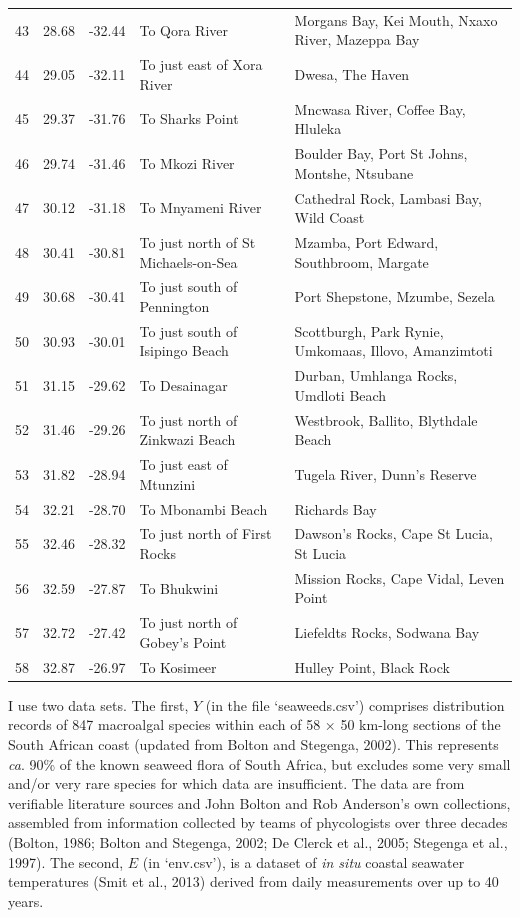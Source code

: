 \documentclass[10pt,a4,]{article}
\begin{document}
\begin{tiny}
\begin{center}
\begin{longtable}{|r|r|r|l|p{6cm}|}
43 & 28.68 & -32.44 & To Qora River & Morgans Bay, Kei Mouth, Nxaxo River, Mazeppa Bay \\
44 & 29.05 & -32.11 & To just east of Xora River & Dwesa, The Haven \\
45 & 29.37 & -31.76 & To Sharks Point & Mncwasa River, Coffee Bay, Hluleka \\
46 & 29.74 & -31.46 & To Mkozi River & Boulder Bay, Port St Johns, Montshe, Ntsubane \\
47 & 30.12 & -31.18 & To Mnyameni River & Cathedral Rock, Lambasi Bay, Wild Coast \\
48 & 30.41 & -30.81 & To just north of St Michaels-on-Sea & Mzamba, Port Edward, Southbroom, Margate \\
49 & 30.68 & -30.41 & To just south of Pennington & Port Shepstone, Mzumbe, Sezela \\
50 & 30.93 & -30.01 & To just south of Isipingo Beach & Scottburgh, Park Rynie, Umkomaas, Illovo, Amanzimtoti \\
51 & 31.15 & -29.62 & To Desainagar & Durban, Umhlanga Rocks, Umdloti Beach \\
52 & 31.46 & -29.26 & To just north of Zinkwazi Beach & Westbrook, Ballito, Blythdale Beach \\
53 & 31.82 & -28.94 & To just east of Mtunzini & Tugela River, Dunn’s Reserve \\
54 & 32.21 & -28.70 & To Mbonambi Beach & Richards Bay \\
55 & 32.46 & -28.32 & To just north of First Rocks & Dawson’s Rocks, Cape St Lucia, St Lucia \\
56 & 32.59 & -27.87 & To Bhukwini & Mission Rocks, Cape Vidal, Leven Point \\
57 & 32.72 & -27.42 & To just north of Gobey’s Point & Liefeldts Rocks, Sodwana Bay \\
58 & 32.87 & -26.97 & To Kosimeer & Hulley Point, Black Rock \\

\end{longtable}
\end{center}
\end{tiny}

I use two data sets. The first, \(Y\) (in the file `seaweeds.csv')
comprises distribution records of 847 macroalgal species within each of
58 × 50 km-long sections of the South African coast (updated from Bolton
and Stegenga, 2002). This represents \emph{ca}. 90\% of the known
seaweed flora of South Africa, but excludes some very small and/or very
rare species for which data are insufficient. The data are from
verifiable literature sources and John Bolton and Rob Anderson's own
collections, assembled from information collected by teams of
phycologists over three decades (Bolton, 1986; Bolton and Stegenga,
2002; De Clerck et al., 2005; Stegenga et al., 1997). The second, \(E\)
(in `env.csv'), is a dataset of \emph{in situ} coastal seawater
temperatures (Smit et al., 2013) derived from daily measurements over up
to 40 years.
\end{document}
